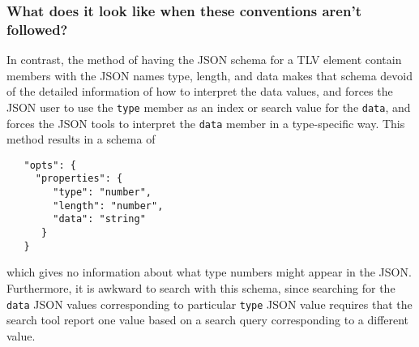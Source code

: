 \documentclass{book}
\begin{document}
\subsubsection{What does it look like when these conventions aren't followed?}
In contrast, the  method of having the JSON schema for a TLV element
contain members with the JSON names type, length, and data
makes that schema devoid of the detailed information of how to
interpret the data values, and forces the JSON user to use the
\texttt{type} member as an index or search value for the
\texttt{data}, and forces the JSON tools to interpret the
\texttt{data} member in a type-specific way.  This method
results in a schema of
\begin{verbatim}
   "opts": { 
     "properties": { 
        "type": "number", 
        "length": "number", 
        "data": "string" 
      }
   }
\end{verbatim}
which gives no information about what type numbers might appear in the
JSON.  Furthermore, it is awkward to search with this schema, since
searching for the \texttt{data} JSON values corresponding to
particular \texttt{type} JSON value requires that the search tool
report one value based on a search query corresponding to a different
value.




 

\end{document}
